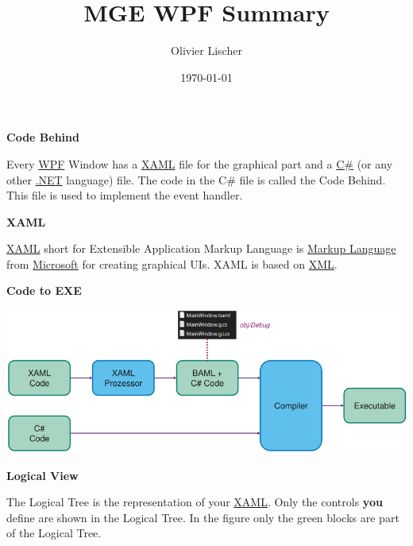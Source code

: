 \documentclass[10pt,twoside,landscape]{article}
\author{Olivier Lischer}
\date{\today}
\title{MGE WPF Summary}
\begin{document}
\begin{multicols}{3}

\textbf{Code Behind}

Every \href{../../../roam/20211123162923-wpf.org}{WPF} Window has a \href{../../../roam/20211123162058-xaml.org}{XAML} file for the graphical part and a \href{../../../roam/20211003114158-c.org}{C\#} (or any other \href{../../../roam/20211003114703-net.org}{.NET} language) file.
The code in the C\# file is called the Code Behind.
This file is used to implement the event handler.

\textbf{XAML}

\href{../../../roam/20211123162058-xaml.org}{XAML} short for Extensible Application Markup Language is \href{../../../roam/20211123161400-markup_language.org}{Markup Language} from \href{../../../roam/20211123161417-microsoft.org}{Microsoft} for creating graphical UIs.
XAML is based on \href{../../../roam/20211112100344-xml.org}{XML}.

\textbf{Code to EXE}

\begin{center}
\includegraphics[width=.9\linewidth]{img/xaml_to_application.png}
\end{center}

\textbf{Logical View}

The Logical Tree is the representation of your \href{../../../roam/20211123162058-xaml.org}{XAML}.
Only the controls \textbf{you} define are shown in the Logical Tree.
In the figure only the green blocks are part of the Logical Tree.


\end{multicols}
\end{document}
